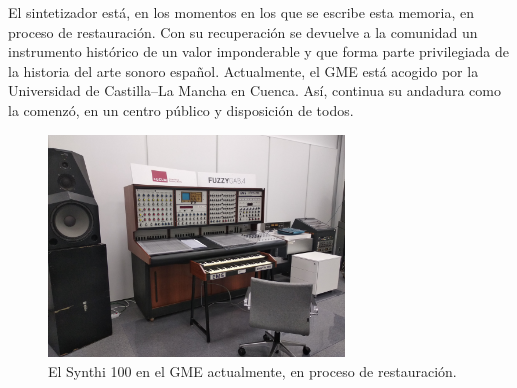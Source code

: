 El sintetizador está, en los momentos en los que se escribe esta memoria, en proceso de restauración. Con su recuperación se devuelve a la comunidad un instrumento histórico de un valor imponderable y que forma parte privilegiada de la historia del arte sonoro español. Actualmente, el GME está acogido por la Universidad de Castilla--La Mancha en Cuenca. Así, continua su andadura como la comenzó, en un centro público y disposición de todos.

\begin{figure}
	\centering
	\includegraphics[width=0.7\textwidth]{synthi_GME_2020}
	\caption[El Synthi 100 en el GME actualmente.]{El Synthi 100 en el GME actualmente, en proceso de restauración.}
	\label{fig:synthi_GME_2020}
\end{figure}



